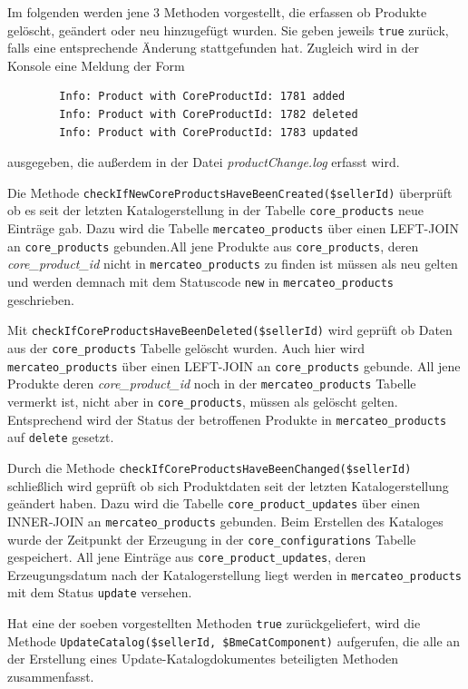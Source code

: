 	Im folgenden werden jene 3 Methoden vorgestellt, die erfassen ob Produkte gelöscht, geändert oder neu hinzugefügt wurden. Sie geben jeweils \texttt{true} zurück, falls eine entsprechende Änderung stattgefunden hat. Zugleich wird in der Konsole eine Meldung der Form 	
		\begin{lstlisting}
		Info: Product with CoreProductId: 1781 added
		Info: Product with CoreProductId: 1782 deleted
		Info: Product with CoreProductId: 1783 updated
		\end{lstlisting} ausgegeben, die außerdem in der Datei \textit{productChange.log} erfasst wird.
			
		Die Methode \texttt{checkIfNewCoreProductsHaveBeenCreated(\$sellerId)} überprüft ob es seit der letzten Katalogerstellung in der Tabelle \texttt{core\_products} neue Einträge gab. Dazu wird die Tabelle \texttt{mercateo\_products} über einen LEFT-JOIN an \texttt{core\_products} gebunden.All jene Produkte aus \texttt{core\_products}, deren \textit{core\_product\_id} nicht in \texttt{mercateo\_products} zu finden ist müssen als neu gelten und werden demnach mit dem Statuscode \texttt{new} in \texttt{mercateo\_products} geschrieben. 
		
	
		Mit \texttt{checkIfCoreProductsHaveBeenDeleted(\$sellerId)} wird geprüft ob Daten aus der \texttt{core\_products} Tabelle gelöscht wurden. Auch hier wird \texttt{mercateo\_products} über einen LEFT-JOIN an \texttt{core\_products} gebunde. All jene Produkte deren \textit{core\_product\_id} 
		noch in der \texttt{mercateo\_products} Tabelle vermerkt ist, nicht aber in \texttt{core\_products}, müssen als gelöscht gelten. Entsprechend wird der Status der betroffenen Produkte in \texttt{mercateo\_products} auf \texttt{delete} gesetzt.
		
		Durch die Methode \texttt{checkIfCoreProductsHaveBeenChanged(\$sellerId)} schließlich wird geprüft ob sich Produktdaten seit der letzten Katalogerstellung geändert haben. Dazu wird die Tabelle \texttt{core\_product\_updates} über einen INNER-JOIN an \texttt{mercateo\_products} gebunden.
		Beim Erstellen des Kataloges wurde der Zeitpunkt der Erzeugung in der \texttt{core\_configurations} Tabelle gespeichert. All jene Einträge aus \texttt{core\_product\_updates}, deren Erzeugungsdatum nach der Katalogerstellung liegt werden in \texttt{mercateo\_products} mit dem Status \texttt{update} versehen.
	
	Hat eine der soeben vorgestellten Methoden \texttt{true} zurückgeliefert, wird die Methode \texttt{UpdateCatalog(\$sellerId, \$BmeCatComponent)} aufgerufen, die alle an der Erstellung eines Update-Katalogdokumentes beteiligten Methoden zusammenfasst.
	
